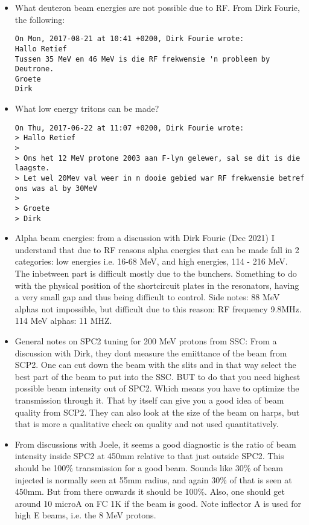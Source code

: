 \documentclass[11pt]{report}
\begin{document}
\begin{itemize}

\item What deuteron beam energies are not possible due to RF. From Dirk Fourie, the following:
\begin{verbatim}
On Mon, 2017-08-21 at 10:41 +0200, Dirk Fourie wrote:
Hallo Retief
Tussen 35 MeV en 46 MeV is die RF frekwensie 'n probleem by Deutrone.
Groete
Dirk
\end{verbatim}

\item What low energy tritons can be made?
\begin{verbatim}
On Thu, 2017-06-22 at 11:07 +0200, Dirk Fourie wrote:
> Hallo Retief
> 
> Ons het 12 MeV protone 2003 aan F-lyn gelewer, sal se dit is die laagste.
> Let wel 20Mev val weer in n dooie gebied war RF frekwensie betref ons was al by 30MeV
> 
> Groete
> Dirk
\end{verbatim}

\item Alpha beam energies: from a discussion with Dirk Fourie (Dec 2021) I understand that 
due to RF reasons alpha energies that can be made fall in 2 categories: low energies i.e. 16-68 MeV, and high energies, 114 - 216 MeV. The inbetween part is difficult mostly due to the bunchers. Something to do with the physical position of the shortcircuit plates in the resonators, having a very small gap and thus being difficult to control.
Side notes: 88 MeV alphas not impossible, but difficult due to this reason: RF frequency 9.8MHz.
114 MeV alphas: 11 MHZ.

\item General notes on SPC2 tuning for 200 MeV protons from SSC:
From a discussion with Dirk, they dont measure the emiittance of the beam from SCP2. One can cut down the beam with the slits and in that way select the best part of the beam to put into the SSC. BUT to do that you need highest possible beam intensity out of SPC2. Which means you have to optimize the transmission through it. That by itself can give you a good idea of beam quality from SCP2.
They can also look at the size of the beam on harps, but that is more a qualitative check on quality and not used quantitatively.

\item From discussions with Joele, it seems a good diagnostic is the ratio of beam intensity inside SPC2 at 450mm relative to that just outside SPC2. This should be 100\% transmission for a good beam. Sounds like 30\% of beam injected is normally seen at 55mm radius, and again 30\% of that is seen at 450mm. But from there onwards it should be 100\%.
Also, one should get around 10 microA on FC 1K if the beam is good.
Note inflector A is used for high E beams, i.e. the 8 MeV protons.


\end{itemize}
\end{document}
